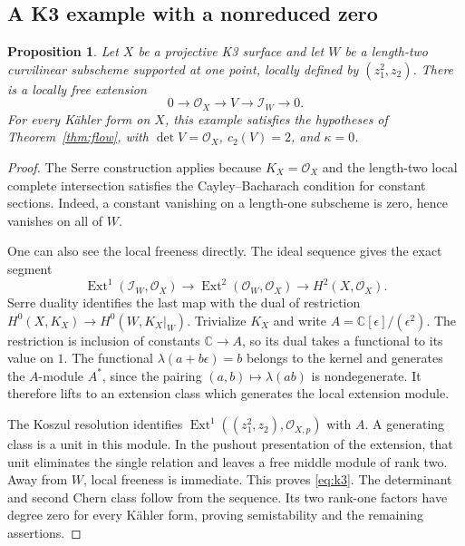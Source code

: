 \documentclass[11pt]{amsart}
\newtheorem{proposition}[theorem]{Proposition}
\theoremstyle{definition}
\theoremstyle{remark}
\newcommand{\CC}{\mathbb C}
\newcommand{\cO}{\mathcal O}
\newcommand{\cI}{\mathcal I}
\newcommand{\Ext}{\operatorname{Ext}}
\begin{document}
\subsection{A K3 example with a nonreduced zero}
\begin{proposition}\label{prop:k3}
Let $X$ be a projective K3 surface and let $W$ be a length-two
curvilinear subscheme supported at one point, locally defined by
$(z_1^2,z_2)$. There is a locally free extension
\begin{equation}\label{eq:k3}
0\longrightarrow\cO_X\longrightarrow V\longrightarrow\cI_W
\longrightarrow0.
\end{equation}
For every K\"ahler form on $X$, this example satisfies the hypotheses
of Theorem~\ref{thm:flow}, with $\det V=\cO_X$, $c_2(V)=2$,
and $\kappa=0$.
\end{proposition}

\begin{proof}
The Serre construction \cite[Theorem~5.1.1]{huybrechtslehn1997} applies because
$K_X=\cO_X$ and the length-two local complete intersection satisfies
the Cayley--Bacharach condition for constant sections. Indeed, a constant
vanishing on a length-one subscheme is zero, hence vanishes on all of $W$.

One can also see the local freeness directly. The ideal sequence gives
the exact segment
\[
\Ext^1(\cI_W,\cO_X)\longrightarrow
\Ext^2(\cO_W,\cO_X)\longrightarrow H^2(X,\cO_X).
\]
Serre duality identifies the last map with the dual of restriction
$H^0(X,K_X)\to H^0(W,K_X|_W)$. Trivialize $K_X$ and write
$A=\CC[\epsilon]/(\epsilon^2)$. The restriction is inclusion of constants
$\CC\to A$, so its dual takes a functional to its value on $1$.
The functional $\lambda(a+b\epsilon)=b$ belongs to the kernel and
generates the $A$-module $A^*$, since the pairing
$(a,b)\mapsto\lambda(ab)$ is nondegenerate. It therefore lifts to an
extension class which generates the local extension module.

The Koszul resolution identifies
$\Ext^1((z_1^2,z_2),\cO_{X,p})$ with $A$. A generating class is a unit
in this module. In the pushout presentation of the extension, that unit
eliminates the single relation and leaves a free middle module of rank
two. Away from $W$, local freeness is immediate. This proves
\eqref{eq:k3}. The determinant and second Chern class follow from the
sequence. Its two rank-one factors have degree zero for every K\"ahler
form, proving semistability and the remaining assertions.
\end{proof}
\end{document}
